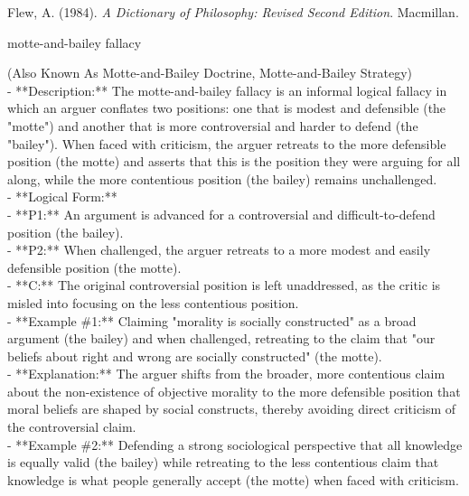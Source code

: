 \documentclass[a4paper,12pt,single,pdftex]{scrartcl}
\begin{document}
          Flew, A. (1984). {\it A Dictionary of Philosophy: Revised Second Edition}. Macmillan.
        
      
    
  

motte-and-bailey fallacy
    
      (Also Known As Motte-and-Bailey Doctrine, Motte-and-Bailey Strategy)
    \\

  
    
      - **Description:** The motte-and-bailey fallacy is an informal logical fallacy in which an arguer conflates two positions: one that is modest and defensible (the "motte") and another that is more controversial and harder to defend (the "bailey"). When faced with criticism, the arguer retreats to the more defensible position (the motte) and asserts that this is the position they were arguing for all along, while the more contentious position (the bailey) remains unchallenged.
    \\

    
      - **Logical Form:**
    \\

    
        - **P1:** An argument is advanced for a controversial and difficult-to-defend position (the bailey).
    \\

    
        - **P2:** When challenged, the arguer retreats to a more modest and easily defensible position (the motte).
    \\

    
        - **C:** The original controversial position is left unaddressed, as the critic is misled into focusing on the less contentious position.
    \\

    
      - **Example \#1:** Claiming "morality is socially constructed" as a broad argument (the bailey) and when challenged, retreating to the claim that "our beliefs about right and wrong are socially constructed" (the motte).
    \\

    
      - **Explanation:** The arguer shifts from the broader, more contentious claim about the non-existence of objective morality to the more defensible position that moral beliefs are shaped by social constructs, thereby avoiding direct criticism of the controversial claim.
    \\

    
      - **Example \#2:** Defending a strong sociological perspective that all knowledge is equally valid (the bailey) while retreating to the less contentious claim that knowledge is what people generally accept (the motte) when faced with criticism.
    \\
\end{document}
